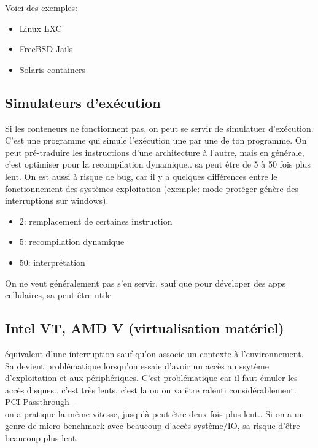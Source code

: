\documentclass[oneside]{book}
\begin{document}
Voici des exemples:\\
\begin{itemize}
\item Linux LXC
\item FreeBSD Jails
\item Solaris containers
\end{itemize}

\subsection{Simulateurs d'exécution}
Si les conteneurs ne fonctionnent pas, on peut se servir de simulatuer d'exécution. C'est une programme qui simule l'exécution une par une de ton programme. On peut pré-traduire les instructions d'une architecture à l'autre, mais en générale, c'est optimiser pour la recompilation dynamique.. sa peut être de 5 à 50 fois plus lent. On est aussi à risque de bug, car il y a quelques différences entre le fonctionnement des systèmes exploitation (exemple: mode protéger génère des interruptions sur windows).\\

\begin{itemize}
\item 2: remplacement de certaines instruction
\item 5: recompilation dynamique
\item 50: interprétation
\end{itemize}

On ne veut généralement pas s'en servir, sauf que pour déveloper des apps cellulaires, sa peut être utile
\subsection{Intel VT, AMD V (virtualisation matériel)}
équivalent d'une interruption sauf qu'on associe un contexte à l'environnement. Sa devient problèmatique lorsqu'on essaie d'avoir un accès au ssytème d'exploitation et aux périphériques. C'est problématique car il faut émuler les accès disques.. c'est très lents, c'est la ou on va être ralenti considérablement. \\

PCI Passthrough --\\

on a pratique la même vitesse, jusqu'à peut-être deux fois plus lent.. Si on a un genre de micro-benchmark avec beaucoup d'accès système/IO, sa risque d'être beaucoup plus lent.\\
\end{document}
